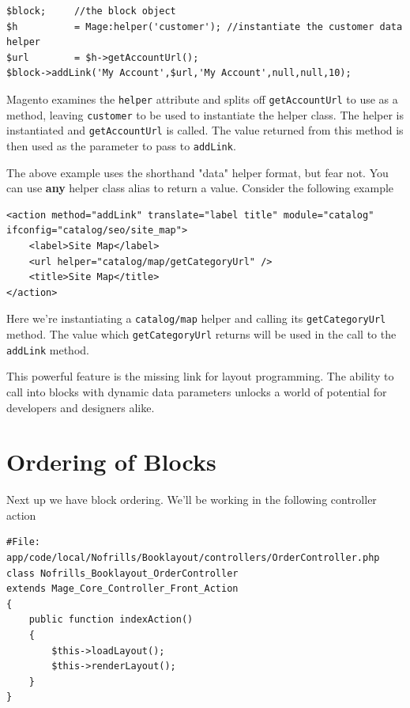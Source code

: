 \documentclass[oneside]{book}
\begin{document}
\begin{lstlisting}
$block;     //the block object
$h          = Mage:helper('customer'); //instantiate the customer data helper
$url        = $h->getAccountUrl();
$block->addLink('My Account',$url,'My Account',null,null,10);

\end{lstlisting}


Magento examines the \footnotesize\texttt{helper} \normalsize  attribute and splits off \footnotesize\texttt{getAccountUrl} \normalsize  to use as a method, leaving \footnotesize\texttt{customer} \normalsize  to be used to instantiate the helper class.  The helper is instantiated and \footnotesize\texttt{getAccountUrl} \normalsize  is called. The value returned from this method is then used as the parameter to pass to \footnotesize\texttt{addLink}\normalsize.

The above example uses the shorthand "data" helper format, but fear not. You can use \textbf{any} helper class alias to return a value. Consider the following example

\begin{lstlisting}
<action method="addLink" translate="label title" module="catalog"
ifconfig="catalog/seo/site_map">
    <label>Site Map</label>
    <url helper="catalog/map/getCategoryUrl" />
    <title>Site Map</title>
</action>

\end{lstlisting}


Here we're instantiating a \footnotesize\texttt{catalog/map} \normalsize  helper and calling its \footnotesize\texttt{getCategoryUrl} \normalsize  method.  The value which \footnotesize\texttt{getCategoryUrl} \normalsize  returns will be used in the call to the \footnotesize\texttt{addLink} \normalsize  method.

This powerful feature is the missing link for layout programming.  The ability to call into blocks with dynamic data parameters unlocks a world of potential for developers and designers alike.

\section{Ordering of Blocks}

Next up we have block ordering.  We'll be working in the following controller action

\begin{lstlisting}
#File: app/code/local/Nofrills/Booklayout/controllers/OrderController.php
class Nofrills_Booklayout_OrderController
extends Mage_Core_Controller_Front_Action
{
    public function indexAction()
    {
        $this->loadLayout();
        $this->renderLayout();
    }
}

\end{lstlisting}
\end{document}
